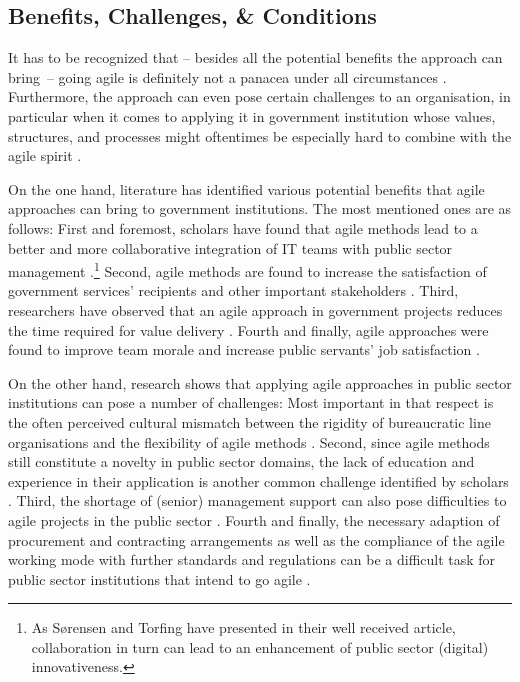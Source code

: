 \subsection{Benefits, Challenges, \& Conditions}
It has to be recognized that – besides all the potential benefits the approach can bring~– going agile is definitely not a panacea under all circumstances \parencite{Rigby2016}. Furthermore, the approach can even pose certain challenges to an organisation, in particular when it comes to applying it in government institution whose values, structures, and processes might oftentimes be especially hard to combine with the agile spirit \parencite{Hajjdiab2011}.

On the one hand, literature has identified various potential benefits that agile approaches can bring to government institutions. The most mentioned ones are as follows: First and foremost, scholars have found that agile methods lead to a better and more collaborative integration of IT teams with public sector management \parencite{Upender2005,berger2005uk, Berger2007,Dubinsky2005}.\footnote{As Sørensen and Torfing \parencite*{Sorensen2011} have presented in their well received article, collaboration in turn can lead to an enhancement of public sector (digital) innovativeness.} Second, agile methods are found to increase the satisfaction of government services' recipients and other important stakeholders \parencite{Fruhling2008,  Fulgham2011, iliev2009case}. Third, researchers have observed that an agile approach in government projects reduces the time required for value delivery \parencite{Upender2005, Surdu2006, McMahon2006, Moore2001}. Fourth and finally, agile approaches were found to improve team morale and increase public servants' job satisfaction \parencite{Hajjdiab2011, Vacari2015, Dubinsky2005}. 

On the other hand, research shows that applying agile approaches in public sector institutions can pose a number of challenges: Most important in that respect is the often perceived cultural mismatch between the rigidity of bureaucratic line organisations and the flexibility of agile methods \parencite{Mergel, Fruhling2008, Altukhova2016, berger2005uk, Greve2019}. Second, since agile methods still constitute a novelty in public sector domains, the lack of education and experience in their application is another common challenge identified by scholars \parencite{Nuottila2016, McMahon2006, Fridman2016}. Third, the shortage of (senior) management support can also pose difficulties to agile projects in the public sector \parencite{Mergel,Berger2007,Dubinsky2005, Hajjdiab2011}. Fourth and finally, the necessary adaption of procurement and contracting arrangements as well as the compliance of the agile working mode with further standards and regulations can be a difficult task for public sector institutions that intend to go agile \parencite{Nuottila2016,Mergel, Fruhling2008, Fulgham2011}.

